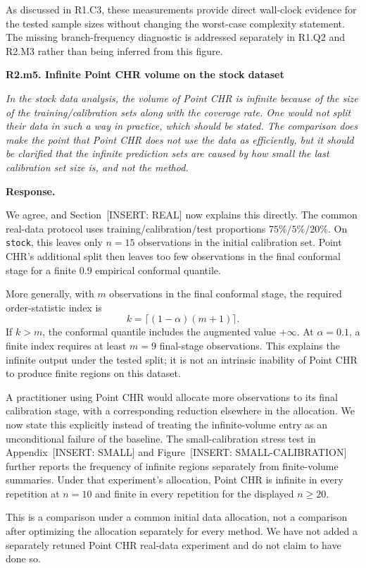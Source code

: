 \documentclass[11pt]{article}
\numberwithin{equation}{section}
\newcommand{\pending}[1]{\textcolor{AuthorRed}{[INSERT: #1]}}
\newcommand{\reviewercomment}[2]{%
  \par\medskip\noindent\textbf{#1}\par\nopagebreak
  \begingroup\color{ReviewerBlue}\itshape #2\par\endgroup
  \noindent\textbf{Response.} }
\newcommand{\SecReal}{Section~\pending{REAL}} %
\newcommand{\AppSmall}{Appendix~\pending{SMALL}} %
\newcommand{\FigSmall}{Figure~\pending{SMALL-CALIBRATION}} %
\begin{document}
As discussed in R1.C3, these measurements provide direct
wall-clock evidence for the tested sample sizes without changing
the worst-case complexity statement. The missing branch-frequency
diagnostic is addressed separately in R1.Q2 and R2.M3 rather than
being inferred from this figure.

\reviewercomment{R2.m5. Infinite Point CHR volume on the stock dataset}{%
In the stock data analysis, the volume of Point CHR is infinite
because of the size of the training/calibration sets along with
the coverage rate. One would not split their data in such a way
in practice, which should be stated. The comparison does make
the point that Point CHR does not use the data as efficiently,
but it should be clarified that the infinite prediction sets
are caused by how small the last calibration set size is, and
not the method.}

We agree, and \SecReal{} now explains this directly. The common
real-data protocol uses training/calibration/test proportions
$75\%/5\%/20\%$. On \texttt{stock}, this leaves only $n=15$
observations in the initial calibration set. Point CHR's additional
split then leaves too few observations in the final conformal
stage for a finite $0.9$ empirical conformal quantile.

More generally, with $m$ observations in the final conformal
stage, the required order-statistic index is
\[
 k=\lceil(1-\alpha)(m+1)\rceil.
\]
If $k>m$, the conformal quantile includes the augmented value
$+\infty$. At $\alpha=0.1$, a finite index requires at least
$m=9$ final-stage observations. This explains the infinite output
under the tested split; it is not an intrinsic inability of
Point CHR to produce finite regions on this dataset.

A practitioner using Point CHR would allocate more observations
to its final calibration stage, with a corresponding reduction
elsewhere in the allocation. We now state this explicitly instead
of treating the infinite-volume entry as an unconditional failure
of the baseline. The small-calibration stress test in \AppSmall{}
and \FigSmall{} further reports the frequency of infinite regions
separately from finite-volume summaries. Under that experiment's
allocation, Point CHR is infinite in every repetition at $n=10$
and finite in every repetition for the displayed $n\geq20$.

This is a comparison under a common initial data allocation, not
a comparison after optimizing the allocation separately for
every method. We have not added a separately retuned Point CHR
real-data experiment and do not claim to have done so.
\end{document}
